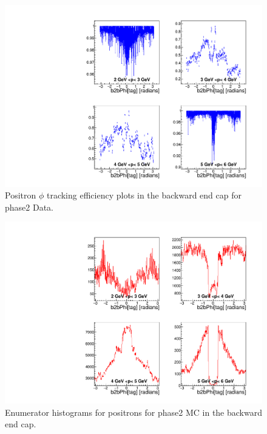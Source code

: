 \documentclass[a4paper,11pt,twosided,final,german,openbib,pdftex,listof=totoc,bibliography=totoc]{scrbook}
\begin{document}
\begin{appendix}
\begin{figure}[!htbp]
	\centering
	\includegraphics[width=\textwidth]{Plots/master/xPMPhiepEC_Data}
	\caption[Momentum $\phi$ Positron Backward End Cap Efficiency Phase2 Data]{Positron $\phi$ tracking efficiency plots in the backward end cap for phase2 Data.}
	\label{plt:PMPhiepEC_Data}
\end{figure}

\begin{figure}[!htbp]
	\centering
	\includegraphics[width=\textwidth]{Plots/master/xPMPhiepECE_MC}
	\caption[Momentum $\phi$ Positron Backward End Cap Enumerator Histogram Phase2 MC]{Enumerator histograms for positrons for phase2 MC in the backward end cap.}
	\label{plt:PMPhiepECE_MC}
\end{figure}


\end{appendix}
\end{document}
